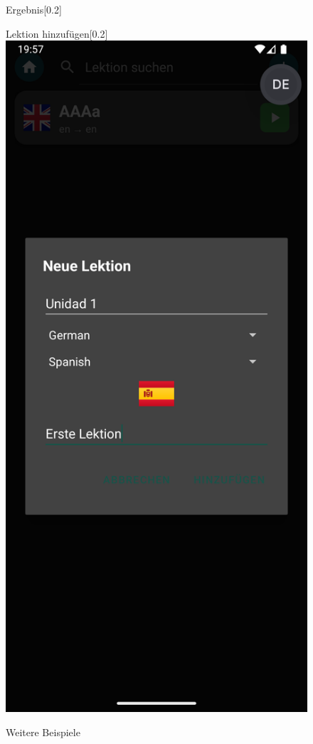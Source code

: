 \documentclass[12pt,a4paper]{article}
\begin{document}
\begin{figure}[h]
\begin{subcaptionbox}{Ergebnis\label{fig:bild1}}[0.2\linewidth]
    \end{subcaptionbox}
    \hfill
    \begin{subcaptionbox}{Lektion hinzufügen\label{fig:bild2}}[0.2\linewidth]
        {\includegraphics[width=\linewidth]{showcase/Add_Lektion.png}}
    \end{subcaptionbox}
    \caption{Weitere Beispiele}
    \label{fig:nebeneinander}
\end{figure}
\end{document}
